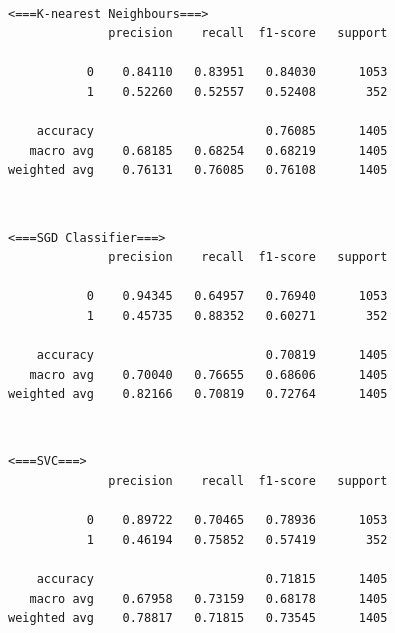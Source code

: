 \documentclass[11pt]{article}
\begin{document}
    \begin{center}
    \end{center}
    { \hspace*{\fill} \\}
    
    \begin{Verbatim}[commandchars=\\\{\}]
 <===K-nearest Neighbours===>
              precision    recall  f1-score   support

           0    0.84110   0.83951   0.84030      1053
           1    0.52260   0.52557   0.52408       352

    accuracy                        0.76085      1405
   macro avg    0.68185   0.68254   0.68219      1405
weighted avg    0.76131   0.76085   0.76108      1405

    \end{Verbatim}

    \begin{center}
    \end{center}
    { \hspace*{\fill} \\}
    
    \begin{Verbatim}[commandchars=\\\{\}]
 <===SGD Classifier===>
              precision    recall  f1-score   support

           0    0.94345   0.64957   0.76940      1053
           1    0.45735   0.88352   0.60271       352

    accuracy                        0.70819      1405
   macro avg    0.70040   0.76655   0.68606      1405
weighted avg    0.82166   0.70819   0.72764      1405

    \end{Verbatim}

    \begin{center}
    \end{center}
    { \hspace*{\fill} \\}
    
    \begin{Verbatim}[commandchars=\\\{\}]
 <===SVC===>
              precision    recall  f1-score   support

           0    0.89722   0.70465   0.78936      1053
           1    0.46194   0.75852   0.57419       352

    accuracy                        0.71815      1405
   macro avg    0.67958   0.73159   0.68178      1405
weighted avg    0.78817   0.71815   0.73545      1405

    \end{Verbatim}
\end{document}
